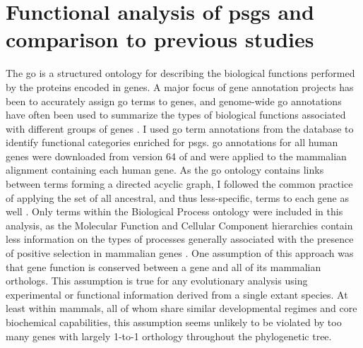 \section{Functional analysis of \acp{psg} and comparison to previous studies}

The \acf{go} \citep{Ashburner2000} is a structured ontology for
describing the biological functions performed by the proteins encoded
in genes. A major focus of gene annotation projects has been to
accurately assign \ac{go} terms to genes, and genome-wide \ac{go}
annotations have often been used to summarize the types of biological
functions associated with different groups of genes
\citep{Camon2004}. I used \ac{go} term annotations from the \ens
database to identify functional categories enriched for
\acp{psg}. \ac{go} annotations for all human genes were downloaded
from version 64 of \ens and were applied to the mammalian alignment
containing each human gene. As the \ac{go} ontology contains links
between terms forming a directed acyclic graph, I followed the common
practice of applying the set of all ancestral, and thus less-specific,
terms to each gene as well \citep{Rivals2007}. Only terms within the
Biological Process ontology were included in this analysis, as the
Molecular Function and Cellular Component hierarchies contain less
information on the types of processes generally associated with the
presence of positive selection in mammalian genes
\citep{Macaque2007}. One assumption of this approach was that gene
function is conserved between a gene and all of its mammalian
orthologs. This assumption is true for any evolutionary analysis using
experimental or functional information derived from a single extant
species. At least within mammals, all of whom share similar
developmental regimes and core biochemical capabilities, this
assumption seems unlikely to be violated by too many genes with
largely 1-to-1 orthology throughout the phylogenetic tree.

